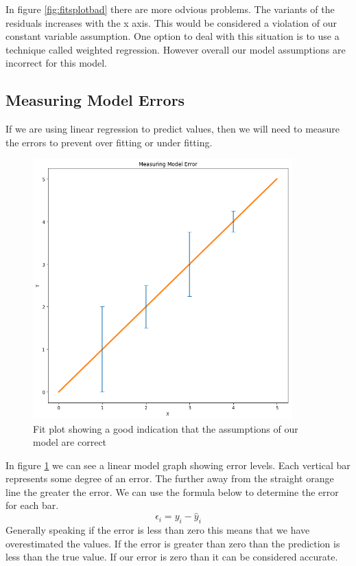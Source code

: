 In figure \ref{fig:fitsplotbad} there are more odvious problems. The variants of the residuals increases with the x axis. This would be considered a violation of our constant variable assumption. One option to deal with this situation is to use a technique called weighted regression. However overall our model assumptions are incorrect for this model.

\subsection{Measuring Model Errors}

If we are using linear regression to predict values, then we will need to measure the errors to prevent over fitting or under fitting.
\begin{figure}[H]
  \centering
  \includegraphics[scale=0.5,width=100mm]{./images/graph-error-bars.png}
  \caption{Fit plot showing a good indication that the assumptions of our model are correct}
  \label{fig:graph-error-bars}
\end{figure}
In figure \ref{fig:graph-error-bars} we can see a linear model graph showing error levels. Each vertical bar represents some degree of an error. The further away from the straight orange line the greater the error. We can use the formula below to determine the error for each bar.
\begin{equation}
    \epsilon_i = y_i - \hat y_i
\end{equation}
Generally speaking if the error is less than zero this means that we have overestimated the values. If the error is greater than zero than the prediction is less than the true value. If our error is zero than it can be considered accurate.

